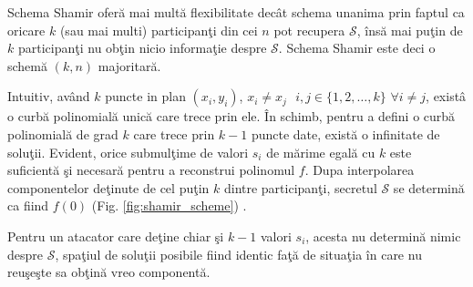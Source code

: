 \documentclass{llncs}
\begin{document}
Schema Shamir ofer\u{a} mai mult\u{a} flexibilitate dec\^{a}t schema unanima prin faptul ca oricare $k$ (sau mai multi) participan\c{t}i
din cei $n$ pot recupera $\mathcal{S}$, \^{i}ns\u{a} mai pu\c{t}in de $k$ participan\c{t}i nu ob\c{t}in nicio informa\c{t}ie despre $\mathcal{S}$. Schema Shamir este deci o schem\u{a} $(k,n)$ majoritar\u{a}.

Intuitiv, av\^{a}nd $k$ puncte in plan $(x_i, y_i)$, $x_i \neq x_j \text{ } i,j \in \{1,2,\dots,k\}$ $\forall i \neq j$, exist\^{a} o curb\u{a} polinomial\u{a} unic\u{a} care trece prin ele.  
\^{I}n schimb, pentru a defini o curb\u{a} polinomial\u{a} de grad $k$ care trece prin $k - 1$ puncte date, exist\u{a} o infinitate de solu\c{t}ii.
Evident, orice submul\c{t}ime de valori $s_i$ de m\u{a}rime egal\u{a} cu $k$ este suficient\u{a} \c{s}i necesar\u{a} pentru a reconstrui polinomul $f$. Dupa interpolarea componentelor de\c{t}inute de cel pu\c{t}in $k$ dintre participan\c{t}i, secretul $\mathcal{S}$ se determin\u{a} ca fiind $f(0)$ (Fig. \ref{fig:shamir_scheme}) \cite{S:1979}.

Pentru un atacator care de\c{t}ine chiar \c{s}i $k-1$ valori $s_i$, acesta nu determin\u{a} nimic despre $\mathcal{S}$, spa\c{t}iul de solu\c{t}ii posibile fiind identic fa\c{t}\u{a} de situa\c{t}ia \^{i}n care nu reu\c{s}e\c{s}te sa ob\c{t}in\u{a} vreo component\u{a}.
\end{document}
